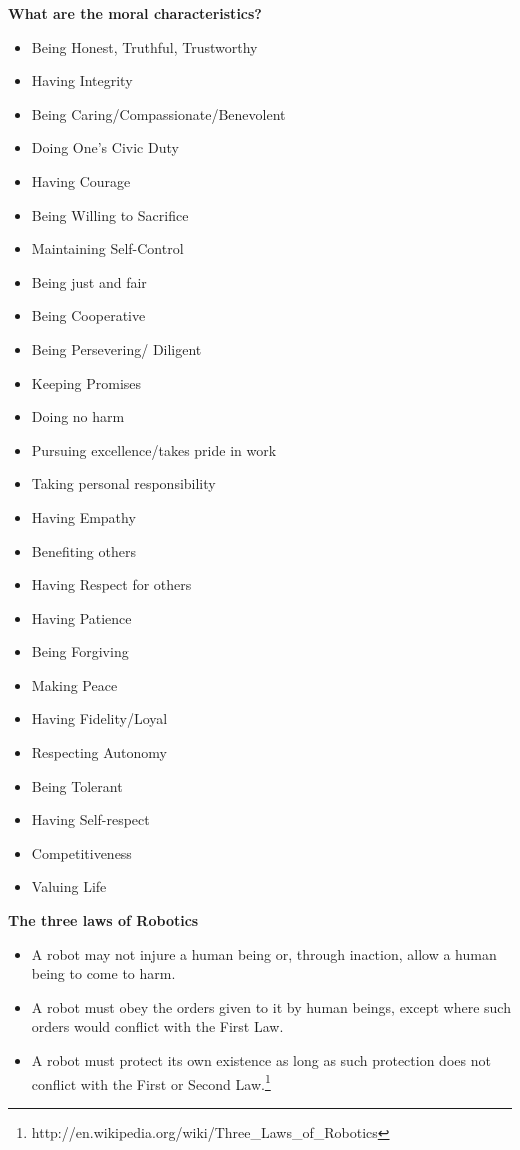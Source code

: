 \documentclass[11pt, oneside]{article}   	%
\begin{document}
\par \textbf{What are the moral characteristics?}
\begin{itemize}
	\item Being Honest, Truthful, Trustworthy
	\item Having Integrity
	\item Being Caring/Compassionate/Benevolent
	\item Doing One's Civic Duty
	\item Having Courage
	\item Being Willing to Sacrifice
	\item Maintaining Self-Control
	\item Being just and fair
	\item Being Cooperative
	\item Being Persevering/ Diligent
	\item Keeping Promises
	\item Doing no harm
	\item Pursuing excellence/takes pride in work
	\item Taking personal responsibility
	\item Having Empathy
	\item Benefiting others 
	\item Having Respect for others
	\item Having Patience
	\item Being Forgiving
	\item Making Peace
	\item Having Fidelity/Loyal
	\item Respecting Autonomy
	\item Being Tolerant
	\item Having Self-respect
	\item Competitiveness
	\item Valuing Life
\end{itemize}

\par \textbf{The three laws of Robotics}
\begin{itemize}
	\item A robot may not injure a human being or, through inaction, allow a human being to come to harm.
	\item A robot must obey the orders given to it by human beings, except where such orders would conflict with the First Law.
	\item A robot must protect its own existence as long as such protection does not conflict with the First or Second Law.\footnote{http://en.wikipedia.org/wiki/Three\_Laws\_of\_Robotics}
\end{itemize}
\end{document}
